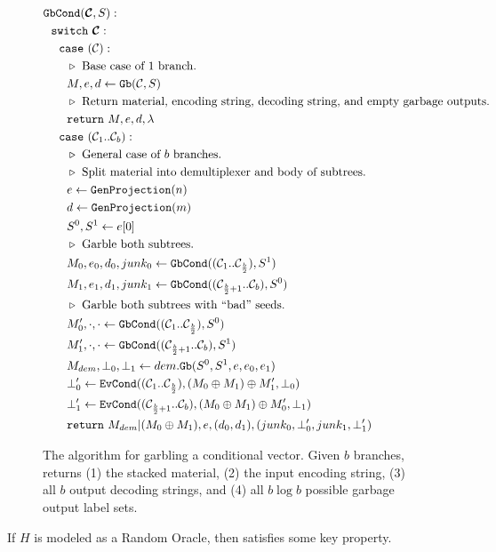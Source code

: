 \begin{figure}
  \begin{align*}
    &\gbcond(\vec{\cir}, S):\\
    &~~\switch~\vec{\cir}:\\
    &~~~~\ccase~(\cir):\\
    &~~~~~~\codecomment{Base case of $1$ branch.}\\
    &~~~~~~M, e, d \gets \gb(\cir, S)\\
    &~~~~~~\codecomment{Return material, encoding string, decoding string, and empty garbage outputs.}\\
    &~~~~~~\creturn~M, e, d, \lambda\\
    &~~~~\ccase~(\cir_1..\cir_b):\\
    &~~~~~~\codecomment{General case of $b$ branches.}\\
    &~~~~~~\codecomment{Split material into demultiplexer and body of subtrees.}\\
    &~~~~~~e \gets \genprojection(n)\\
    &~~~~~~d \gets \genprojection(m)\\
    &~~~~~~S^0, S^1 \gets e[0]\\
    &~~~~~~\codecomment{Garble both subtrees.}\\
    &~~~~~~M_0,e_0,d_0,junk_0 \gets \gbcond((\cir_1..\cir_{\frac{b}{2}}), S^1)\\
    &~~~~~~M_1,e_1,d_1,junk_1 \gets \gbcond((\cir_{\frac{b}{2}+1}..\cir_b), S^0)\\
    &~~~~~~\codecomment{Garble both subtrees with ``bad'' seeds.}\\
    &~~~~~~M_0',\cdot,\cdot \gets \gbcond((\cir_1..\cir_{\frac{b}{2}}), S^0)\\
    &~~~~~~M_1',\cdot,\cdot \gets \gbcond((\cir_{\frac{b}{2}+1}..\cir_b), S^1)\\
    &~~~~~~M_{dem},\bot_0, \bot_1 \gets dem.\gb(S^0, S^1, e, e_0, e_1)\\
    &~~~~~~\bot_0' \gets \evcond((\cir_1..\cir_{\frac{b}{2}}), (M_0 \oplus M_1) \oplus M_1', \bot_0)\\
    &~~~~~~\bot_1' \gets \evcond((\cir_{\frac{b}{2}+1}..\cir_b), (M_0 \oplus M_1) \oplus M_0', \bot_1)\\
    &~~~~~~\creturn~M_{dem}|(M_0\oplus M_1), e, (d_0,d_1), (junk_0,\bot_0',junk_1,\bot_1')
  \end{align*}
  \caption{%
    The algorithm for garbling a conditional vector.
    Given $b$ branches, \gbcond returns (1) the stacked material, (2)
    the input encoding string, (3) all $b$ output decoding strings,
    and (4) all $b\log b$ possible garbage output label sets.
  }
\end{figure}






\begin{theorem}\label{thm:key}
  If $H$ is modeled as a Random Oracle, then  satisfies some key property.
\end{theorem}
